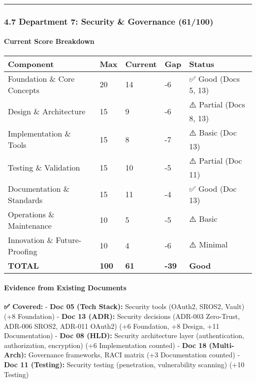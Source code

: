 \documentclass[
]{article}
\begin{document}
\begin{center}\rule{0.5\linewidth}{0.5pt}\end{center}

\hypertarget{department-7-security-governance-61100}{%
\subsubsection{4.7 Department 7: Security \& Governance
(61/100)}\label{department-7-security-governance-61100}}

\hypertarget{current-score-breakdown-6}{%
\paragraph{Current Score Breakdown}\label{current-score-breakdown-6}}

\begin{longtable}[]{@{}lllll@{}}
\toprule\noalign{}
Component & Max & Current & Gap & Status \\
\midrule\noalign{}
\endhead
\bottomrule\noalign{}
\endlastfoot
Foundation \& Core Concepts & 20 & 14 & -6 & ✅ Good (Docs 5, 13) \\
Design \& Architecture & 15 & 9 & -6 & ⚠️ Partial (Docs 8, 13) \\
Implementation \& Tools & 15 & 8 & -7 & ⚠️ Basic (Doc 13) \\
Testing \& Validation & 15 & 10 & -5 & ⚠️ Partial (Doc 11) \\
Documentation \& Standards & 15 & 11 & -4 & ✅ Good (Doc 13) \\
Operations \& Maintenance & 10 & 5 & -5 & ⚠️ Basic \\
Innovation \& Future-Proofing & 10 & 4 & -6 & ⚠️ Minimal \\
\textbf{TOTAL} & \textbf{100} & \textbf{61} & \textbf{-39} &
\textbf{Good} \\
\end{longtable}

\hypertarget{evidence-from-existing-documents-6}{%
\paragraph{Evidence from Existing
Documents}\label{evidence-from-existing-documents-6}}

\textbf{✅ Covered:} - \textbf{Doc 05 (Tech Stack):} Security tools
(OAuth2, SROS2, Vault) (+8 Foundation) - \textbf{Doc 13 (ADR):} Security
decisions (ADR-003 Zero-Trust, ADR-006 SROS2, ADR-011 OAuth2) (+6
Foundation, +8 Design, +11 Documentation) - \textbf{Doc 08 (HLD):}
Security architecture layer (authentication, authorization, encryption)
(+6 Implementation counted) - \textbf{Doc 18 (Multi-Arch):} Governance
frameworks, RACI matrix (+3 Documentation counted) - \textbf{Doc 11
(Testing):} Security testing (penetration, vulnerability scanning) (+10
Testing)
\end{document}
